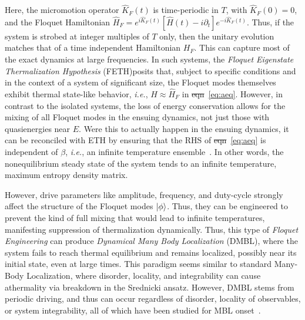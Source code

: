 \documentclass[%
reprint,
superscriptaddress,
amsmath,amssymb,
aps,
prb,
showkeys,
]{revtex4-2}
\providecommand{\DIFaddtex}[1]{{\protect\color{blue}\uwave{#1}}} %
\providecommand{\DIFdeltex}[1]{{\protect\color{red}\sout{#1}}}                      %
\providecommand{\DIFaddbegin}{} %
\providecommand{\DIFaddend}{} %
\providecommand{\DIFdelbegin}{} %
\providecommand{\DIFdelend}{} %
\providecommand{\DIFadd}[1]{\texorpdfstring{\DIFaddtex{#1}}{#1}} %
\providecommand{\DIFdel}[1]{\texorpdfstring{\DIFdeltex{#1}}{}} %
\newcommand{\DIFscaledelfig}{0.5}
\newlength{\DIFdelgraphicswidth} %
\newlength{\DIFdelgraphicsheight} %
\newcommand{\DIFaddincludegraphics}[2][]{{\color{blue}\fbox{\DIFOincludegraphics[#1]{#2}}}} %
\newcommand{\DIFdelincludegraphics}[2][]{%
\sbox{\DIFdelgraphicsbox}{\DIFOincludegraphics[#1]{#2}}%
\settoboxwidth{\DIFdelgraphicswidth}{\DIFdelgraphicsbox} %
\settoboxtotalheight{\DIFdelgraphicsheight}{\DIFdelgraphicsbox} %
\scalebox{\DIFscaledelfig}{%
\parbox[b]{\DIFdelgraphicswidth}{\usebox{\DIFdelgraphicsbox}\\[-\baselineskip] \rule{\DIFdelgraphicswidth}{0em}}\llap{\resizebox{\DIFdelgraphicswidth}{\DIFdelgraphicsheight}{%
\setlength{\unitlength}{\DIFdelgraphicswidth}%
\begin{picture}(1,1)%
\thicklines\linethickness{2pt} %
{\color[rgb]{1,0,0}\put(0,0){\framebox(1,1){}}}%
{\color[rgb]{1,0,0}\put(0,0){\line( 1,1){1}}}%
{\color[rgb]{1,0,0}\put(0,1){\line(1,-1){1}}}%
\end{picture}%
}\hspace*{3pt}}} %
} %
\DeclareRobustCommand{\DIFaddbegin}{\DIFOaddbegin \let\includegraphics\DIFaddincludegraphics} %
\DeclareRobustCommand{\DIFaddend}{\DIFOaddend \let\includegraphics\DIFOincludegraphics} %
\DeclareRobustCommand{\DIFdelbegin}{\DIFOdelbegin \let\includegraphics\DIFdelincludegraphics} %
\DeclareRobustCommand{\DIFdelend}{\DIFOaddend \let\includegraphics\DIFOincludegraphics} %
\begin{document}
Here, the micromotion operator $\hat{K}_F(t)$ is time-periodic in $T$, with $\hat{K}_F(0)=0$, and the Floquet Hamiltonian  {$\hat{H}_F = e^{i\hat{K}_F(t)} \left[\hat{H}(t)-i\partial_t\right] e^{-i \hat{K}_F(t)}$}. Thus, if the system is strobed at integer multiples of $T$ only, then the unitary evolution matches that of a time independent Hamiltonian $H_F$. This can capture most of the exact dynamics at large frequencies. In such systems, the \textit{Floquet Eigenstate Thermalization Hypothesis} (FETH)\DIFaddbegin \DIFadd{\mbox{%
\cite{Mori_2018, Mori_2023_1} }\hspace{0pt}%
}\DIFaddend posits that, subject to specific conditions and in the context of a system of significant size, the Floquet modes themselves exhibit thermal state-like behavior, \textit{i.e.}, $\hat{H}\approx \hat{H}_F$ in \DIFdelbegin \DIFdel{eqn}\DIFdelend \DIFaddbegin \DIFadd{eq.}\DIFaddend ~\ref{eq:aeq}. However, in contrast to the isolated systems, the loss of energy conservation allows for the mixing of all Floquet modes in the ensuing dynamics, not just those with quasienergies near $E$. Were this to actually happen in the ensuing dynamics,  {it can be reconciled with ETH by ensuring that the RHS of \DIFdelbegin \DIFdel{eqn}\DIFdelend \DIFaddbegin \DIFadd{eq.}\DIFaddend }~\ref{eq:aeq} {is independent of} $\beta$, \textit{i.e.}{, an infinite temperature ensemble}~\cite{alessio}. In other words, the nonequilibrium steady state of the system tends to an infinite temperature, maximum entropy density matrix.

However, drive parameters like amplitude, frequency, and duty-cycle strongly affect the structure of the Floquet modes $\ket{\phi}$. Thus, they can be engineered to prevent the kind of full mixing that would lead to infinite temperatures, manifesting suppression of thermalization dynamically. Thus, this type of \textit{Floquet Engineering} can produce \textit{Dynamical Many Body Localization} (DMBL), where the system fails to reach thermal equilibrium and remains localized, possibly  near its initial state, even at large times. This paradigm seems similar to standard Many-Body Localization\cite{Sougata2023, sierant_2023}, where disorder, locality, and integrability can cause athermality via breakdown in the Srednicki ansatz. However, DMBL {stems from periodic driving}, and thus can occur regardless of disorder, locality of observables, or system integrability, all of which have been studied for MBL onset~\cite{Sougata2023,Fabien2018,garratt_resonant_2022}.
\end{document}
